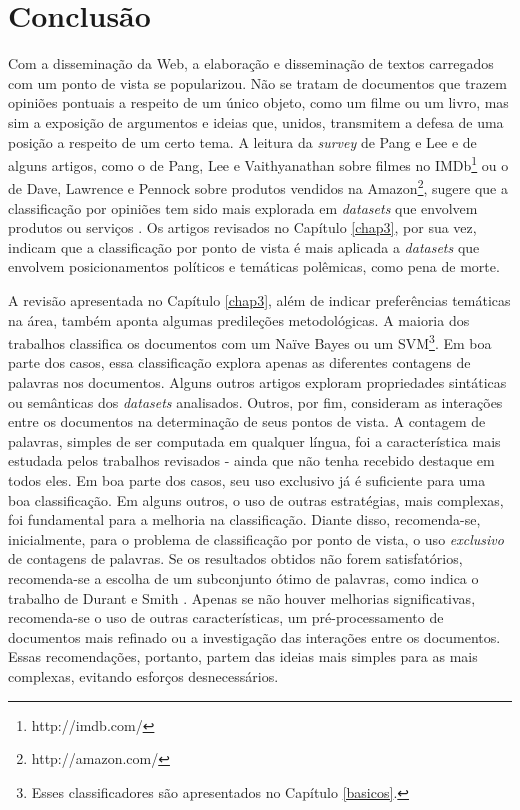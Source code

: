 \chapter{Conclusão}
\label{conclusoes}

Com a disseminação da Web, a elaboração e disseminação de textos carregados com um ponto de vista se popularizou. Não se tratam de documentos que trazem opiniões pontuais a respeito de um único objeto, como um filme ou um livro, mas sim a exposição de argumentos e ideias que, unidos, transmitem a defesa de uma posição a respeito de um certo tema. A leitura da \emph{survey} de Pang e Lee e de alguns artigos, como o de Pang, Lee e Vaithyanathan sobre filmes no IMDb\footnote{http://imdb.com/} ou o de Dave, Lawrence e Pennock sobre produtos vendidos na Amazon\footnote{http://amazon.com/}, sugere que a classificação por opiniões tem sido mais explorada em \emph{datasets} que envolvem produtos ou serviços \cite{omsa, thumbs-up, peanut-gallery}. Os artigos revisados no Capítulo \ref{chap3}, por sua vez, indicam que a classificação por ponto de vista é mais aplicada a \emph{datasets} que envolvem posicionamentos políticos e temáticas polêmicas, como pena de morte.

A revisão apresentada no Capítulo \ref{chap3}, além de indicar preferências temáticas na área, também aponta algumas predileções metodológicas. A maioria dos trabalhos classifica os documentos com um Naïve Bayes ou um SVM\footnote{Esses classificadores são apresentados no Capítulo \ref{basicos}.}. Em boa parte dos casos, essa classificação explora apenas as diferentes contagens de palavras nos documentos. Alguns outros artigos exploram propriedades sintáticas ou semânticas dos \emph{datasets} analisados. Outros, por fim, consideram as interações entre os documentos na determinação de seus pontos de vista. A contagem de palavras, simples de ser computada em qualquer língua, foi a característica mais estudada pelos trabalhos revisados - ainda que não tenha recebido destaque em todos eles. Em boa parte dos casos, seu uso exclusivo já é suficiente para uma boa classificação. Em alguns outros, o uso de outras estratégias, mais complexas, foi fundamental para a melhoria na classificação. Diante disso, recomenda-se, inicialmente, para o problema de classificação por ponto de vista, o uso \emph{exclusivo} de contagens de palavras. Se os resultados obtidos não forem satisfatórios, recomenda-se a escolha de um subconjunto ótimo de palavras, como indica o trabalho de Durant e Smith \cite{durant-smith}. Apenas se não houver melhorias significativas, recomenda-se o uso de outras características, um pré-processamento de documentos mais refinado ou a investigação das interações entre os documentos. Essas recomendações, portanto, partem das ideias mais simples para as mais complexas, evitando esforços desnecessários. 

